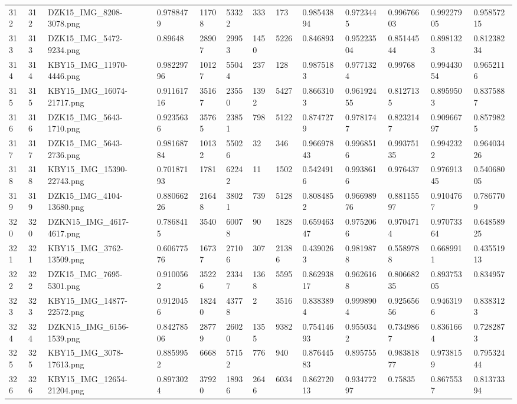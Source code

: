 \documentclass[11pt, a4paper, twoside]{report}
\begin{document}
\begin{longtable}[c]{@{}lllllllllllll@{}}
312 & 312 & DZK15\_IMG\_8208-3078.png & 0.9788479 & 11708 & 53322 & 333 & 173 & 0.98543894 & 0.9723445 & 0.99676603 & 0.99227905 & 0.95857215 \\
313 & 313 & DZK15\_IMG\_5472-9234.png & 0.89648 & 28907 & 29953 & 1450 & 5226 & 0.846893 & 0.95223504 & 0.85144544 & 0.8981323 & 0.81238234 \\
314 & 314 & KBY15\_IMG\_11970-4446.png & 0.98229796 & 10127 & 55044 & 237 & 128 & 0.9875183 & 0.9771324 & 0.99768 & 0.99443054 & 0.9652116 \\
315 & 315 & KBY15\_IMG\_16074-21717.png & 0.91161716 & 35167 & 23550 & 1392 & 5427 & 0.8663103 & 0.96192455 & 0.8127135 & 0.8959503 & 0.8375887 \\
316 & 316 & DZK15\_IMG\_5643-1710.png & 0.9235636 & 35765 & 23851 & 798 & 5122 & 0.8747279 & 0.9781747 & 0.8232147 & 0.90966797 & 0.8579825 \\
317 & 317 & DZK15\_IMG\_5643-2736.png & 0.98168784 & 10132 & 55026 & 32 & 346 & 0.96697843 & 0.9968516 & 0.99375135 & 0.9942322 & 0.96403426 \\
318 & 318 & KBY15\_IMG\_15390-22743.png & 0.70187193 & 1781 & 62242 & 11 & 1502 & 0.5424916 & 0.9938616 & 0.976437 & 0.97691345 & 0.54068005 \\
319 & 319 & DZK15\_IMG\_4104-13680.png & 0.88066226 & 21648 & 38021 & 739 & 5128 & 0.8084852 & 0.96698976 & 0.88115597 & 0.9104767 & 0.7867709 \\
320 & 320 & DZKN15\_IMG\_4617-4617.png & 0.7868415 & 3540 & 60078 & 90 & 1828 & 0.65946347 & 0.9752066 & 0.9704714 & 0.97073364 & 0.64858925 \\
321 & 321 & KBY15\_IMG\_3762-13509.png & 0.60677576 & 16737 & 27106 & 307 & 21386 & 0.4390263 & 0.9819878 & 0.5589788 & 0.6689911 & 0.43551913 \\
322 & 322 & DZK15\_IMG\_7695-5301.png & 0.9100562 & 35226 & 23347 & 1368 & 5595 & 0.86293817 & 0.9626168 & 0.80668235 & 0.89375305 & 0.834957 \\
323 & 323 & KBY15\_IMG\_14877-22572.png & 0.9120456 & 18240 & 43778 & 2 & 3516 & 0.8383894 & 0.9998904 & 0.92565656 & 0.9463196 & 0.8383123 \\
324 & 324 & DZKN15\_IMG\_6156-1539.png & 0.84278506 & 28779 & 26020 & 1355 & 9382 & 0.75414693 & 0.9550342 & 0.7349867 & 0.8361664 & 0.7282873 \\
325 & 325 & KBY15\_IMG\_3078-17613.png & 0.8859952 & 6668 & 57152 & 776 & 940 & 0.87644583 & 0.895755 & 0.98381877 & 0.9738159 & 0.79532444 \\
326 & 326 & KBY15\_IMG\_12654-21204.png & 0.8973024 & 37920 & 18936 & 2646 & 6034 & 0.86272013 & 0.93477297 & 0.75835 & 0.8675537 & 0.81373394 \\

\end{longtable}
\end{document}
